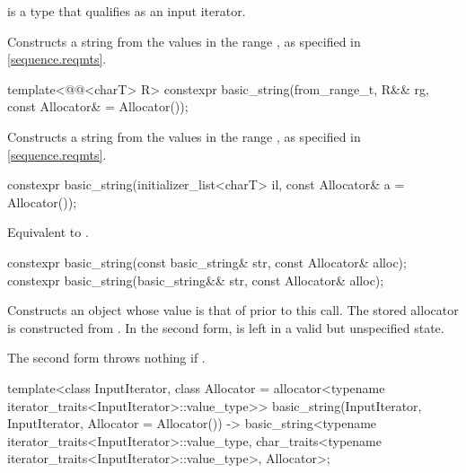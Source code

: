 \begin{itemdescr}
\pnum
\constraints
{} is a type that qualifies as an input
iterator.

\pnum
\effects
Constructs a string from the values in the range ,
as specified in \ref{sequence.reqmts}.
\end{itemdescr}

%
\begin{itemdecl}
template<@@<charT> R>
  constexpr basic_string(from_range_t, R&& rg, const Allocator& = Allocator());
\end{itemdecl}

\begin{itemdescr}
\pnum
\effects
Constructs a string from the values in the range ,
as specified in \ref{sequence.reqmts}.
\end{itemdescr}

%
\begin{itemdecl}
constexpr basic_string(initializer_list<charT> il, const Allocator& a = Allocator());
\end{itemdecl}

\begin{itemdescr}
\pnum
\effects
Equivalent to .
\end{itemdescr}

%
\begin{itemdecl}
constexpr basic_string(const basic_string& str, const Allocator& alloc);
constexpr basic_string(basic_string&& str, const Allocator& alloc);
\end{itemdecl}

\begin{itemdescr}
\pnum
\effects
Constructs an object whose value is
that of  prior to this call.
The stored allocator is constructed from .
In the second form,  is left in a valid but unspecified state.

\pnum
\throws
The second form throws nothing if .
\end{itemdescr}

\begin{itemdecl}
template<class InputIterator,
         class Allocator = allocator<typename iterator_traits<InputIterator>::value_type>>
  basic_string(InputIterator, InputIterator, Allocator = Allocator())
    -> basic_string<typename iterator_traits<InputIterator>::value_type,
                    char_traits<typename iterator_traits<InputIterator>::value_type>,
                    Allocator>;
\end{itemdecl}

